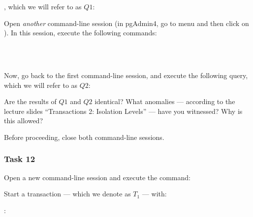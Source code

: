 \vgap

\noindent {}, which we will refer to as $Q1$:

\vgap

\noindent {}

\vgap

\noindent Open {\em another} command-line session (in pgAdmin4, go to menu  and then click on ). In this session, execute the following commands:

\vgap

\noindent {}  \\
\noindent {}  \\
\noindent {}

\vgap

\noindent Now, go back to the first command-line session, and execute the following query, which we will refer to as $Q2$:

\vgap

\noindent {}

\vgap

\noindent Are the results of $Q1$ and $Q2$ identical? What anomalies --- according to the lecture slides ``Transactions 2:
Isolation Levels'' --- have you witnessed? Why is this allowed?

\vgap

\noindent Before proceeding, close both command-line sessions.

\subsubsection{Task 12}

Open a new command-line session and execute the command:

\vgap

\noindent {}

\vgap

\noindent Start a transaction --- which we denote as $T_1$ --- with:

\vgap

\noindent {}

\vgap

\noindent {}:

\vgap

\noindent {}

